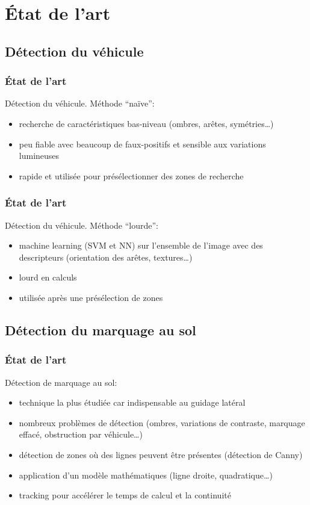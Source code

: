 \section{État de l'art}

\subsection{Détection du véhicule}
\begin{frame}
\frametitle{État de l'art}

Détection du véhicule. Méthode ``naïve'':
\begin{itemize}
    \item recherche de caractéristiques bas-niveau (ombres, arêtes, symétries…)
    \item peu fiable avec beaucoup de faux-positifs et sensible aux variations lumineuses
    \item rapide et utilisée pour présélectionner des zones de recherche
\end{itemize}
\end{frame}

\begin{frame}
\frametitle{État de l'art}

Détection du véhicule. Méthode ``lourde'':
\begin{itemize}
    \item machine learning (SVM et NN) sur l'ensemble de l'image avec des descripteurs (orientation des arêtes, textures…)
    \item lourd en calculs
    \item utilisée après une présélection de zones
\end{itemize}
\end{frame}

\subsection{Détection du marquage au sol}
\begin{frame}
\frametitle{État de l'art}

Détection de marquage au sol:
\begin{itemize}
    \item technique la plus étudiée car indispensable au guidage latéral
    \item nombreux problèmes de détection (ombres, variations de contraste, marquage effacé, obstruction par véhicule…)
    \item détection de zones où des lignes peuvent être présentes (détection de Canny)
    \item application d'un modèle mathématiques (ligne droite, quadratique…)
    \item tracking pour accélérer le temps de calcul et la continuité
\end{itemize}

\end{frame}

